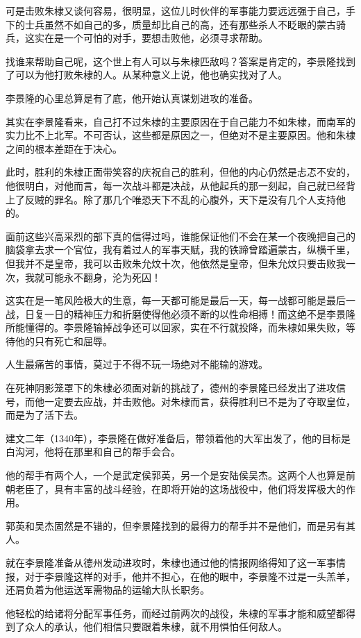 \begin{multicols}{\theparacolNo}
		可是击败朱棣又谈何容易，很明显，这位儿时伙伴的军事能力要远远强于自己，手下的士兵虽然不如自己的多，质量却比自己的高，还有那些杀人不眨眼的蒙古骑兵，这实在是一个可怕的对手，要想击败他，必须寻求帮助。

		找谁来帮助自己呢，这个世上有人可以与朱棣匹敌吗？答案是肯定的，李景隆找到了可以为他打败朱棣的人。从某种意义上说，他也确实找对了人。

		李景隆的心里总算是有了底，他开始认真谋划进攻的准备。

		其实在李景隆看来，自己打不过朱棣的主要原因在于自己能力不如朱棣，而南军的实力比不上北军。不可否认，这些都是原因之一，但绝对不是主要原因。他和朱棣之间的根本差距在于决心。

		此时，胜利的朱棣正面带笑容的庆祝自己的胜利，但他的内心仍然是忐忑不安的，他很明白，对他而言，每一次战斗都是决战，从他起兵的那一刻起，自己就已经背上了反贼的罪名。除了那几个唯恐天下不乱的心腹外，天下是没有几个人支持他的。

		面前这些兴高采烈的部下真的信得过吗，谁能保证他们不会在某一个夜晚把自己的脑袋拿去求一个官位，我有着过人的军事天赋，我的铁蹄曾踏遍蒙古，纵横千里，但我并不是皇帝，我可以击败朱允炆十次，他依然是皇帝，但朱允炆只要击败我一次，我就可能永不翻身，沦为死囚！

		这实在是一笔风险极大的生意，每一天都可能是最后一天，每一战都可能是最后一战，日复一日的精神压力和折磨使得他必须不断的以性命相搏！而这绝不是李景隆所能懂得的。李景隆输掉战争还可以回家，实在不行就投降，而朱棣如果失败，等待他的只有死亡和屈辱。

		人生最痛苦的事情，莫过于不得不玩一场绝对不能输的游戏。

		在死神阴影笼罩下的朱棣必须面对新的挑战了，德州的李景隆已经发出了进攻信号，而他一定要去应战，并击败他。对朱棣而言，获得胜利已不是为了夺取皇位，而是为了活下去。

		建文二年（1340年），李景隆在做好准备后，带领着他的大军出发了，他的目标是白沟河，他将在那里和自己的帮手会合。

		他的帮手有两个人，一个是武定侯郭英，另一个是安陆侯吴杰。这两个人也算是前朝老臣了，具有丰富的战斗经验，在即将开始的这场战役中，他们将发挥极大的作用。

		郭英和吴杰固然是不错的，但李景隆找到的最得力的帮手并不是他们，而是另有其人。

		就在李景隆准备从德州发动进攻时，朱棣也通过他的情报网络得知了这一军事情报，对于李景隆这样的对手，他并不担心，在他的眼中，李景隆不过是一头羔羊，还肩负着为他运送军需物品的运输大队长职务。

		他轻松的给诸将分配军事任务，而经过前两次的战役，朱棣的军事才能和威望都得到了众人的承认，他们相信只要跟着朱棣，就不用惧怕任何敌人。


\end{multicols}
